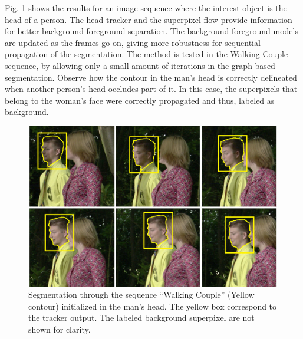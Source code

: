 Fig. \ref{figurelabel_walking} shows the results for an image sequence where the interest object is the head of a person.
The head tracker and the superpixel flow provide information for better background-foreground separation. The
background-foreground models are updated as the frames go on, giving more robustness for sequential
propagation of the segmentation. The method is tested in the Walking Couple sequence, by allowing only a small amount of iterations in the
graph based segmentation. Observe how the contour in the man's head is correctly delineated when
another person's head occludes part of it. In this case, the superpixels that belong to the woman’s face
were correctly propagated and thus, labeled as background. \\
   \begin{figure}[thpb]
      \centering
      \includegraphics[width=1.0\textwidth]{../images/Sequence2.png}
      \caption{Segmentation through the sequence “Walking
	       Couple” (Yellow contour) initialized in the man’s head. The yellow box correspond to the tracker output.
	        The labeled background superpixel are not shown for clarity.}
      \label{figurelabel_walking}
   \end{figure}

